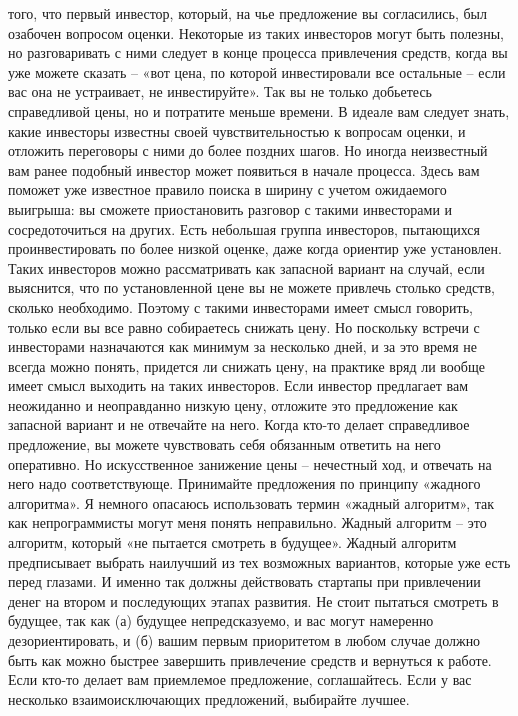 \documentclass[ebook,12pt,oneside,openany]{memoir}
\begin{document}
того, что первый инвестор, который, на чье предложение вы согласились,
был озабочен вопросом оценки. Некоторые из таких инвесторов могут быть
полезны, но разговаривать с ними следует в конце процесса привлечения
средств, когда вы уже можете сказать – «вот цена, по которой
инвестировали все остальные – если вас она не устраивает, не
инвестируйте». Так вы не только добьетесь справедливой цены, но и
потратите меньше времени. В идеале вам следует знать, какие инвесторы
известны своей чувствительностью к вопросам оценки, и отложить
переговоры с ними до более поздних шагов. Но иногда неизвестный вам
ранее подобный инвестор может появиться в начале процесса. Здесь вам
поможет уже известное правило поиска в ширину с учетом ожидаемого
выигрыша: вы сможете приостановить разговор с такими инвесторами и
сосредоточиться на других. Есть небольшая группа инвесторов,
пытающихся проинвестировать по более низкой оценке, даже когда
ориентир уже установлен. Таких инвесторов можно рассматривать как
запасной вариант на случай, если выяснится, что по установленной цене
вы не можете привлечь столько средств, сколько необходимо. Поэтому с
такими инвесторами имеет смысл говорить, только если вы все равно
собираетесь снижать цену. Но поскольку встречи с инвесторами
назначаются как минимум за несколько дней, и за это время не всегда
можно понять, придется ли снижать цену, на практике вряд ли вообще
имеет смысл выходить на таких инвесторов. Если инвестор предлагает вам
неожиданно и неоправданно низкую цену, отложите это предложение как
запасной вариант и не отвечайте на него. Когда кто-то делает
справедливое предложение, вы можете чувствовать себя обязанным
ответить на него оперативно. Но искусственное занижение цены –
нечестный ход, и отвечать на него надо соответствующе. Принимайте
предложения по принципу «жадного алгоритма». Я немного опасаюсь
использовать термин «жадный алгоритм», так как непрограммисты могут
меня понять неправильно. Жадный алгоритм – это алгоритм, который «не
пытается смотреть в будущее». Жадный алгоритм предписывает выбрать
наилучший из тех возможных вариантов, которые уже есть перед глазами.
И именно так должны действовать стартапы при привлечении денег на
втором и последующих этапах развития. Не стоит пытаться смотреть в
будущее, так как (а) будущее непредсказуемо, и вас могут намеренно
дезориентировать, и (б) вашим первым приоритетом в любом случае должно
быть как можно быстрее завершить привлечение средств и вернуться к
работе. Если кто-то делает вам приемлемое предложение, соглашайтесь.
Если у вас несколько взаимоисключающих предложений, выбирайте лучшее.
\end{document}
